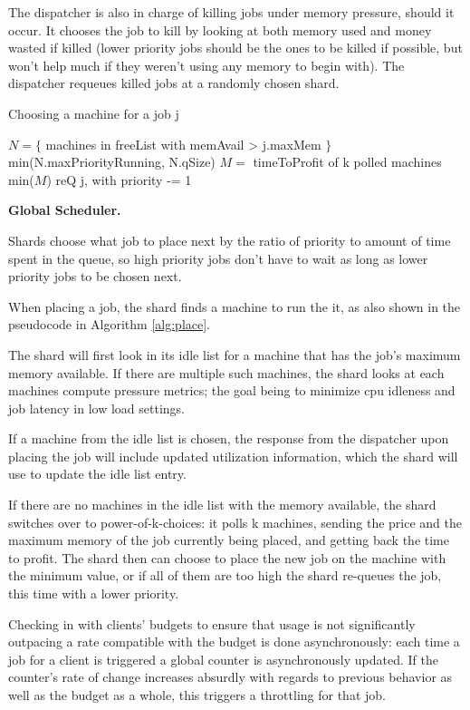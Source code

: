 The dispatcher is also in charge of killing jobs under memory pressure, should
it occur. It chooses the job to kill by looking at both memory used and money
wasted if killed (lower priority jobs should be the ones to be killed if
possible, but won't help much if they weren't using any memory to begin with).
The dispatcher requeues killed jobs at a randomly chosen shard.


\begin{algorithm}[t]
\caption{Choosing a machine for a job j}\label{alg:place}
\begin{algorithmic}
    \State$N = \{ $ machines in freeList with memAvail > j.maxMem $\}$
     \\
        \Return$ $min(N.maxPriorityRunning, N.qSize)
    \EndIf
    \State$M = $ timeToProfit of k polled machines
     \\
        \Return$ $min($M$)
    \Else
        \State$ $reQ j, with priority -= 1
    \EndIf
\end{algorithmic}
\end{algorithm}


\textbf{Global Scheduler.}

Shards choose what job to place next by the ratio of priority to amount of time
spent in the queue, so high priority jobs don't have to wait as long as lower
priority jobs to be chosen next.

When placing a job, the shard finds a machine to run the it, as also shown in
the pseudocode in Algorithm \ref{alg:place}. 

The shard will first look in its idle list for a machine that has the job's
maximum memory available. If there are multiple such machines, the shard looks
at each machines compute pressure metrics; the goal being to minimize cpu
idleness and job latency in low load settings. 

If a machine from the idle list is chosen, the response from the dispatcher upon
placing the job will include updated utilization information, which the shard
will use to update the idle list entry.

If there are no machines in the idle list with the memory available, the shard
switches over to power-of-k-choices: it polls k machines, sending the price and
the maximum memory of the job currently being placed, and getting back the time
to profit. The shard then can choose to place the new job on the machine with
the minimum value, or if all of them are too high the shard re-queues the job,
this time with a lower priority.

Checking in with clients' budgets to ensure that usage is not significantly
outpacing a rate compatible with the budget is done asynchronously: each time a
job for a client is triggered a global counter is asynchronously updated. If the
counter's rate of change increases absurdly with regards to previous behavior as
well as the budget as a whole, this triggers a throttling for that job.

